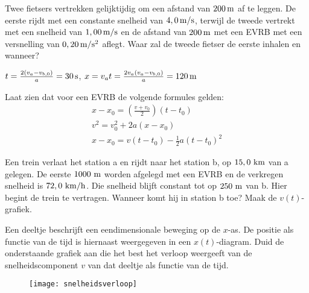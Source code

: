 \documentclass{ximera}
\begin{document}
\begin{exercise} Twee fietsers vertrekken gelijktijdig om
een afstand van $200\rm\,m$ af te leggen. De eerste rijdt met een
constante snelheid van $4,0\rm\,m/s$, terwijl de tweede vertrekt met
een snelheid van $1,00\rm\,m/s$ en de afstand van $200\rm\,m$ met
een EVRB met een versnelling van $0,20\rm\,m/s^2$ aflegt. Waar zal
de tweede fietser de eerste inhalen en wanneer?
\begin{oplossing}
\newline
$t=\frac{2(v_a-v_{b,0})}{a}=30\rm\,s$,
$x=v_at=\frac{2v_a(v_a-v_{b,0})}{a}=120\rm\,m$
\end{oplossing}

\end{exercise}

\begin{exercise} Laat zien dat voor een EVRB de volgende formules gelden:
\begin{eqnarray*}
x-x_0=\left(\frac{v+v_0}{2}\right)(t-t_0)\\
v^2=v_0^2+2a(x-x_0)\\
x-x_0=v(t-t_0)-\frac{1}{2}a(t-t_0)^2
\end{eqnarray*}

\end{exercise}

\begin{exercise} Een trein verlaat het station a en rijdt
naar het station b, op $15,0~\rm km$ van a gelegen. De eerste
$1000~\rm m$ worden afgelegd met een EVRB en de verkregen snelheid
is $72,0~\rm km/h$. Die snelheid blijft constant tot op $250~\rm m$
van b. Hier begint de trein te vertragen. Wanneer komt hij in
station b toe? Maak de $v(t)$-grafiek.










\end{exercise}

\begin{exercise} 
\begin{minipage}[t]{0.5\textwidth}
Een deeltje beschrijft een eendimensionale beweging op de $x$-as. De positie als functie van de tijd is hiernaast weergegeven in een $x(t)$-diagram. Duid de onderstaande grafiek aan die het best het verloop weergeeft van de snelheidscomponent $v$ van dat deeltje als functie van de tijd. 
\end{minipage}
\hspace{0.1\textwidth}
\begin{minipage}[t]{0.3\textwidth}
\end{minipage}
\begin{figure}[h]
\begin{flushright}
\texttt{[image: snelheidsverloop]}
\end{flushright}
\end{figure}

\end{exercise}
\end{document}
